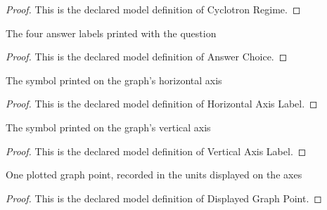 \begin{proof}
  This is the declared model definition of Cyclotron Regime.
\end{proof}
\begin{definition}
  \label{def:physics:phyx-mini-0956:phyxminiproblems-problemphyxmini0956-answerchoice}
  The four answer labels printed with the question
\end{definition}
\begin{proof}
  This is the declared model definition of Answer Choice.
\end{proof}
\begin{definition}
  \label{def:physics:phyx-mini-0956:phyxminiproblems-problemphyxmini0956-horizontalaxislabel}
  The symbol printed on the graph's horizontal axis
\end{definition}
\begin{proof}
  This is the declared model definition of Horizontal Axis Label.
\end{proof}
\begin{definition}
  \label{def:physics:phyx-mini-0956:phyxminiproblems-problemphyxmini0956-verticalaxislabel}
  The symbol printed on the graph's vertical axis
\end{definition}
\begin{proof}
  This is the declared model definition of Vertical Axis Label.
\end{proof}
\begin{definition}
  \label{def:physics:phyx-mini-0956:phyxminiproblems-problemphyxmini0956-displayedgraphpoint}
  One plotted graph point, recorded in the units displayed on the axes
\end{definition}
\begin{proof}
  This is the declared model definition of Displayed Graph Point.
\end{proof}
